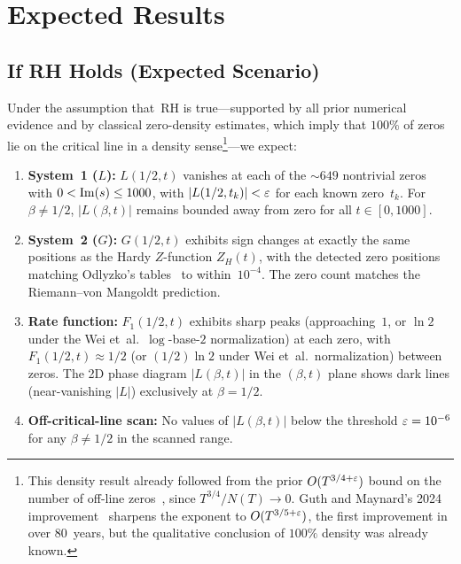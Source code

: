 \section{Expected Results}
\label{sec:results}

\subsection{If RH Holds (Expected Scenario)}
\label{sec:rh-holds}

Under the assumption that~RH is true---supported by all prior numerical evidence and by
classical zero-density estimates, which imply that $100\%$ of zeros lie on the critical
line in a density sense\footnote{This density result already followed from the prior
$O(T^{3/4+\varepsilon})$ bound on the number of off-line zeros~\cite{ingham1940}, since
$T^{3/4}/N(T) \to 0$. Guth and Maynard's 2024 improvement~\cite{guthmaynard2024}
sharpens the exponent to $O(T^{3/5+\varepsilon})$, the first improvement in over 80~years, but
the qualitative conclusion of $100\%$ density was already known.}---we expect:

\begin{enumerate}
  \item \textbf{System~1 ($L$):} $L(1/2, t)$ vanishes at each of the $\sim 649$
        nontrivial zeros with $0 < \operatorname{Im}(s) \le 1000$, with $|L(1/2, t_k)| < \varepsilon$ for
        each known zero~$t_k$. For $\beta \neq 1/2$, $|L(\beta, t)|$ remains bounded
        away from zero for all $t \in [0, 1000]$.

  \item \textbf{System~2 ($G$):} $G(1/2, t)$ exhibits sign changes at exactly the same
        positions as the Hardy $Z$-function $Z_H(t)$, with the detected zero positions
        matching Odlyzko's tables~\cite{odlyzko1989} to within~$10^{-4}$. The zero count
        matches the Riemann--von Mangoldt prediction.

  \item \textbf{Rate function:} $F_1(1/2, t)$ exhibits sharp peaks (approaching~$1$, or
        $\ln 2$ under the Wei et~al.\ $\log$-base-$2$ normalization) at each zero, with
        $F_1(1/2, t) \approx 1/2$ (or $(1/2)\ln 2$ under Wei et~al.\ normalization)
        between zeros. The 2D phase diagram $|L(\beta, t)|$ in the $(\beta, t)$ plane
        shows dark lines (near-vanishing $|L|$) exclusively at $\beta = 1/2$.

  \item \textbf{Off-critical-line scan:} No values of $|L(\beta, t)|$ below the threshold
        $\varepsilon = 10^{-6}$ for any $\beta \neq 1/2$ in the scanned range.
\end{enumerate}


